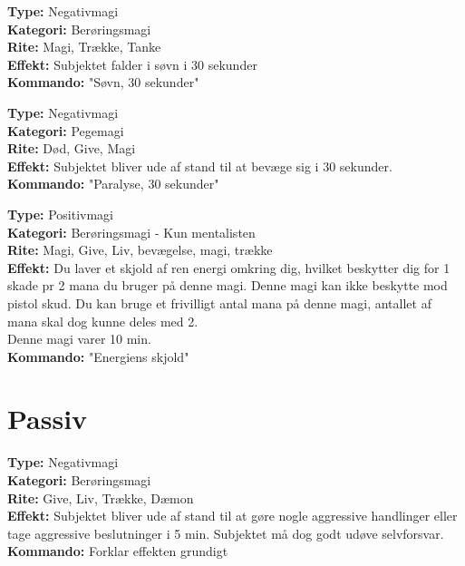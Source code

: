 \begin{defensiv*}[Søvn]
\textbf{Type:} Negativmagi\\
\textbf{Kategori:} Berøringsmagi\\
\textbf{Rite:} Magi, Trække, Tanke\\
\textbf{Effekt:} Subjektet falder i søvn i 30 sekunder\\
\textbf{Kommando:} "Søvn, 30 sekunder"\\
\end{defensiv*}

\begin{defensiv*}[Paralyse]
\textbf{Type:} Negativmagi\\
\textbf{Kategori:} Pegemagi\\
\textbf{Rite:} Død, Give, Magi\\
\textbf{Effekt:} Subjektet bliver ude af stand til at bevæge sig i 30 sekunder.\\
\textbf{Kommando:} "Paralyse, 30 sekunder"\\
\end{defensiv*}

\begin{defensiv*}
\textbf{Type:} Positivmagi\\
\textbf{Kategori:} Berøringsmagi - Kun mentalisten\\
\textbf{Rite:} Magi, Give, Liv, bevægelse, magi, trække\\
\textbf{Effekt:} Du laver et skjold af ren energi omkring dig, hvilket beskytter dig for 1 skade pr 2 mana du bruger på denne magi. Denne magi kan ikke beskytte mod pistol skud. Du kan bruge et frivilligt antal mana på denne magi, antallet af mana skal dog kunne deles med 2.\\
Denne magi varer 10 min.\\
\textbf{Kommando:} "Energiens skjold"
\end{defensiv*}

\section{Passiv}

\begin{passiv*}
\textbf{Type:} Negativmagi\\
\textbf{Kategori:} Berøringsmagi\\
\textbf{Rite:} Give, Liv, Trække, Dæmon\\
\textbf{Effekt:} Subjektet bliver ude af stand til at gøre nogle aggressive handlinger eller tage aggressive beslutninger i 5 min. Subjektet må dog godt udøve selvforsvar.\\
\textbf{Kommando:} Forklar effekten grundigt
\end{passiv*}

